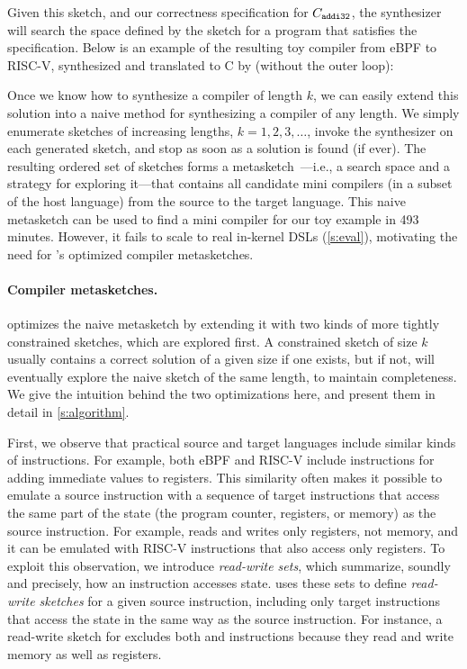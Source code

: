 Given this sketch, and our correctness specification for $C_{\texttt{addi32}}$, the
synthesizer will search the space defined by the sketch for a program that
satisfies the specification.
%
Below is an example of the resulting toy compiler from eBPF to
RISC-V, synthesized and translated to C by \jitsynth (without the
outer loop):\tighten

Once we know how to synthesize a compiler of length $k$, we can easily extend
this solution into a naive method for synthesizing a compiler of any length. We
simply enumerate sketches of increasing lengths, $k = 1, 2, 3, \ldots$, invoke
the synthesizer on each generated sketch, and stop as soon as a solution is
found (if ever). The resulting ordered set of sketches forms a
metasketch~\cite{bornholt:synapse}---i.e., a search space and a strategy for
exploring it---that contains all candidate mini compilers (in a subset of the
host language) from the source to the target language. This naive metasketch can
be used to find a mini compiler for our toy example in {493 minutes}. However,
it fails to scale to real in-kernel DSLs (\autoref{s:eval}), motivating the need
for \jitsynth's optimized compiler metasketches.\tighten

\paragraph{Compiler metasketches.} \jitsynth optimizes the naive metasketch by
extending it with two kinds of more tightly constrained sketches, which are
explored first. A constrained sketch of size $k$ usually contains a correct
solution of a given size if one exists, but if not, \jitsynth will eventually
explore the naive sketch of the same length, to maintain completeness. We give
the intuition behind the two optimizations here, and present them in detail in
\autoref{s:algorithm}. 

First, we observe that practical source and target languages include similar
kinds of instructions. For example, both eBPF and RISC-V include instructions
for adding immediate values to registers. This similarity often makes it
possible to emulate a source instruction with a sequence of target instructions
that access the same part of the state (the program counter, registers, or
memory) as the source instruction. For example,  reads and writes
only registers, not memory, and it can be emulated with RISC-V instructions that
also access only registers. To exploit this observation, we introduce
\emph{read-write sets}, which summarize, soundly and precisely, how an
instruction accesses state. \jitsynth uses these sets to define \emph{read-write
sketches} for a given source instruction, including only target instructions
that access the state in the same way as the source instruction. For instance, a
read-write sketch for  excludes both  and  instructions
because they read and write memory as well as registers.\tighten


